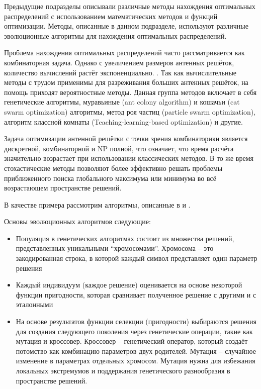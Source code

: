 Предыдущие подразделы описывали различные методы нахождения оптимальных распределений с использованием математических 
методов и функций оптимизации. Методы, описанные в данном подразделе, используют различные эволюционные алгоритмы 
для нахождения оптимальных распределений.

Проблема нахождения оптимальных распределений часто рассматривается как комбинаторная задача. Однако с увеличением 
размеров антенных решёток, количество вычислений растёт экспоненциально. \cite{jain2012solving}. Так как вычислительные методы 
с трудом применимы для разреживания больших антенных решёток, на помощь приходят вероятностные методы. Данная группа 
методов включает в себя генетические алгоритмы, муравьиные (ant colony algorithm) и 
кошачьи (cat swarm optimization) алгоритмы, метод роя частиц (particle swarm optimization), 
алгоритм классной комнаты (Teaching-learning-based optimization) и другие. 

Задача оптимизации антенной решётки с точки зрения комбинаторики является дискретной, комбинаторной и NP полной, что 
означает, что время расчёта значительно возрастает при использовании классических методов. В то же время стохастические 
методы позволяют более эффективно решать проблемы приближенного поиска глобального максимума или минимума во 
всё возрастающем пространстве решений. 

В качестве примера рассмотрим алгоритмы, описанные в \cite{jain2012solving} и \cite{luo2015synthesis}. 

Основы эволюционных алгоритмов следующие:
\begin{itemize}
    \item Популяция в генетических алгоритмах состоит из множества решений, представленных уникальными “хромосомами”. 
    Хромосома -- это закодированная строка, в которой каждый символ представляет один параметр решения
    \item Каждый индивидуум (каждое решение) оценивается на основе некоторой функции пригодности, которая сравнивает 
    полученное решение с другими и с эталонными
    \item На основе результатов функции селекции (пригодности) выбираются решения для создания следующего поколения через 
    генетические операции, такие как мутация и кроссовер. Кроссовер -- генетический оператор, который создаёт потомство как 
    комбинацию параметров двух родителей. Мутация -- случайное изменение в параметрах отдельных хромосом. Мутация нужна для 
    избежания локальных экстремумов и поддержания генетического разнообразия в пространстве решений.
\end{itemize}


